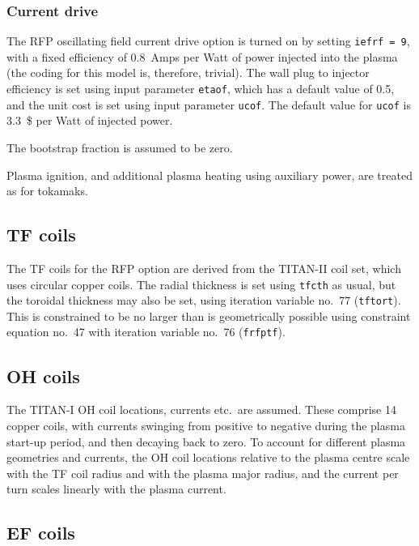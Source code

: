 \documentclass[11pt,a4paper]{report}
\begin{document}
\subsubsection{Current drive}
\label{sec:rfpcd}

The RFP oscillating field current drive option is turned on by setting
\texttt{iefrf = 9}, with a fixed efficiency of 0.8~Amps per Watt of power
injected into the plasma (the coding for this model is, therefore,
trivial). The wall plug to injector efficiency is set using input parameter
\texttt{etaof}, which has a default value of 0.5, and the unit cost is set
using input parameter \texttt{ucof}. The default value for \texttt{ucof} is
3.3~\$ per Watt of injected power.

The bootstrap fraction is assumed to be zero.

Plasma ignition, and additional plasma heating using auxiliary power, are
treated as for tokamaks.

\subsection{TF coils}

The TF coils for the RFP option are derived from the TITAN-II coil set, which
uses circular copper coils. The radial thickness is set using \texttt{tfcth}
as usual, but the toroidal thickness may also be set, using iteration variable
no.\ 77 (\texttt{tftort}). This is constrained to be no larger than is
geometrically possible using constraint equation no.\ 47 with iteration
variable no.\ 76 (\texttt{frfptf}).

\subsection{OH coils}

The TITAN-I OH coil locations, currents etc.\ are assumed. These comprise 14
copper coils, with currents swinging from positive to negative during the
plasma start-up period, and then decaying back to zero. To account for
different plasma geometries and currents, the OH coil locations relative to
the plasma centre scale with the TF coil radius and with the plasma major
radius, and the current per turn scales linearly with the plasma current.

\subsection{EF coils}
\end{document}
